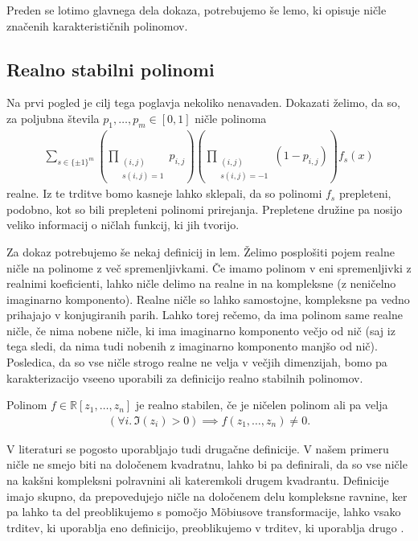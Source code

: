 Preden se lotimo glavnega dela dokaza, potrebujemo še lemo, ki opisuje ničle značenih karakterističnih polinomov.

\subsection{Realno stabilni polinomi}
Na prvi pogled je cilj tega poglavja nekoliko nenavaden. Dokazati želimo, da so, za poljubna števila \(p_1, \ldots, p_m \in [0,1]\) ničle polinoma
\begin{align*}
    \sum_{s\in \{\pm 1\}^m} \left(\prod_{\substack{(i,j) \\s(i,j)=1}} p_{i,j}\right) \left(\prod_{\substack{(i,j)\\s(i,j)=-1}} (1- p_{i,j})\right) f_s(x)
\end{align*}
realne. Iz te trditve bomo kasneje lahko sklepali, da so polinomi \(f_s\) prepleteni, podobno, kot so bili prepleteni polinomi prirejanja. Prepletene družine pa nosijo veliko informacij o ničlah funkcij, ki jih tvorijo.

Za dokaz potrebujemo še nekaj definicij in lem. Želimo posplošiti pojem realne ničle na polinome z več spremenljivkami. Če imamo polinom v eni spremenljivki z realnimi koeficienti, lahko ničle delimo na realne in na kompleksne (z neničelno imaginarno komponento). Realne ničle so lahko samostojne, kompleksne pa vedno prihajajo v konjugiranih parih. Lahko torej rečemo, da ima polinom same realne ničle, če nima nobene ničle, ki ima imaginarno komponento večjo od nič (saj iz tega sledi, da nima tudi nobenih z imaginarno komponento manjšo od nič). Posledica, da so vse ničle strogo realne ne velja v večjih dimenzijah, bomo pa karakterizacijo vseeno uporabili za definicijo realno stabilnih polinomov.
\begin{definicija}
    Polinom \(f\in \mathbb R[z_1, \ldots, z_n]\) je realno stabilen, če je ničelen polinom ali pa velja
    \begin{align*}
        \left(\forall i.\, \Im(z_i) > 0\right) \implies f(z_1, \ldots, z_n) \neq 0.
    \end{align*}
\end{definicija}
V literaturi se pogosto uporabljajo tudi drugačne definicije. V našem primeru ničle ne smejo biti na določenem kvadratnu, lahko bi pa definirali, da so vse ničle na kakšni kompleksni polravnini ali kateremkoli drugem kvadrantu. Definicije imajo skupno, da prepovedujejo ničle na določenem delu kompleksne ravnine, ker pa lahko ta del preoblikujemo s pomočjo Möbiusove transformacije, lahko vsako trditev, ki uporablja eno definicijo, preoblikujemo v trditev, ki uporablja drugo \cite{mckenzie}.


